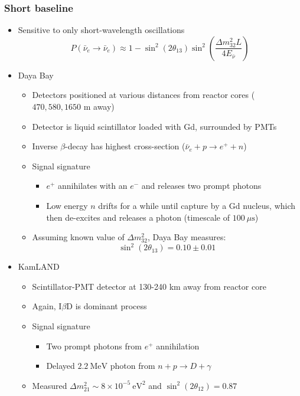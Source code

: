 \documentclass[11pt]{article}
\newcommand{\nubar}{{\bar{\nu}}}
\newcommand{\ev}{\text{eV}}
\newcommand{\mus}{\mu\text{s}}
\newcommand{\mev}{\text{MeV}}
\newcommand{\el}{\ensuremath{e^{-}}}
\newcommand{\pos}{\ensuremath{e^{+}}}
\begin{document}
\subsubsection{Short baseline}
\begin{itemize}
  \item Sensitive to only short-wavelength oscillations
  \begin{equation}
    P(\nubar_e\rightarrow \nubar_e) \approx 1- \sin^2(2\theta_{13}) \sin^2 \left(\frac{\Delta m_{32}^2 L}{4E_\nubar}\right)
  \end{equation}
  \item Daya Bay
  \begin{itemize}
    \item Detectors positioned at various distances from reactor cores ($470, 580, 1650$ m away)
    \item Detector is liquid scintillator loaded with Gd, surrounded by PMTs
    \item Inverse $\beta$-decay has highest cross-section ($\nubar_e+p\rightarrow \pos+n$)
    \item Signal signature
    \begin{itemize}
      \item $\pos$ annihilates with an $\el$ and releases two prompt photons
      \item Low energy $n$ drifts for a while until capture by a Gd nucleus, which then de-excites and releases a photon (timescale of $100~\mus$)
    \end{itemize}
    \item Assuming known value of $\Delta m_{32}^2$, Daya Bay measures:
    \begin{equation}
      \sin^2(2\theta_{13}) = 0.10 \pm 0.01
    \end{equation}
  \end{itemize}
  \item KamLAND
  \begin{itemize}
    \item Scintillator-PMT detector at 130-240 km away from reactor core
    \item Again, I$\beta$D is dominant process
    \item Signal signature
    \begin{itemize}
      \item Two prompt photons from $\pos$ annihilation
      \item Delayed $2.2~\mev$ photon from $n+p\rightarrow D+\gamma$
    \end{itemize}
    \item Measured $\Delta m_{21}^2\sim 8\times 10^{-5}~\ev^2$ and $\sin^2(2\theta_{12})=0.87$
  \end{itemize}
\end{itemize}
\end{document}

